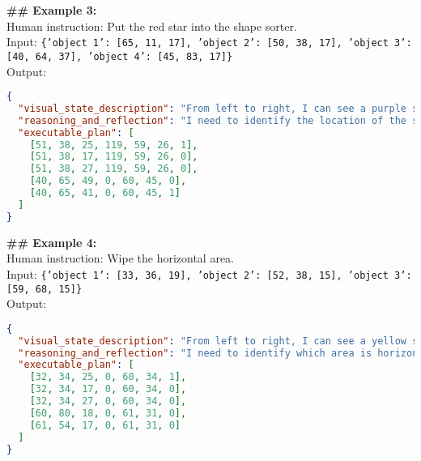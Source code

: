 \begin{tcolorbox}[colback=gray!5!white, colframe=gray!75!black, 
title=In-context examples for EB-Manipulation, boxrule=0.5mm, width=\textwidth, arc=3mm, auto outer arc=true]
\textbf{\#\# Example 3:}\\
Human instruction: Put the red star into the shape sorter.\\
Input: \texttt{\{'object 1': [65, 11, 17], 'object 2': [50, 38, 17], 'object 3': [40, 64, 37], 'object 4': [45, 83, 17]\}}\\
Output:
\begin{lstlisting}[language=json]
{
  "visual_state_description": "From left to right, I can see a purple star at [65, 11, 17], a red star at [50, 38, 17], a shape sorter at [40, 64, 37] and a green star at [45, 83, 17].",
  "reasoning_and_reflection": "I need to identify the location of the star hole on the shape sorter first. I can see that the star hole is at the center of the shape sorter, which is at [40, 64, 37]. Then, the task is to pick up the red star at [50, 38, 17] and put it into the star hole on the shape sorter. The plan involves moving the gripper to the star's position, closing the gripper to pick it up, moving upwards, moving to the top of the star hole, and releasing the star into the hole.",
  "executable_plan": [
    [51, 38, 25, 119, 59, 26, 1], 
    [51, 38, 17, 119, 59, 26, 0], 
    [51, 38, 27, 119, 59, 26, 0], 
    [40, 65, 49, 0, 60, 45, 0], 
    [40, 65, 41, 0, 60, 45, 1]
  ]
}
\end{lstlisting}
\textbf{\#\# Example 4:}\\
Human instruction: Wipe the horizontal area.\\
Input: \texttt{\{'object 1': [33, 36, 19], 'object 2': [52, 38, 15], 'object 3': [59, 68, 15]\}}\\
Output:
\begin{lstlisting}[language=json]
{
  "visual_state_description": "From left to right, I can see a yellow sponge at [33, 36, 19], a green rectangle area at [52, 38, 15] and an orange rectangle area at [59, 68, 15].",
  "reasoning_and_reflection": "I need to identify which area is horizontal first. I can see that the orange rectangle area at [59, 68, 15] is horizontal since it is parallel to the green arrow representing the y-axis of the coordinate system annotated in the image. Then, the task is to pick up the sponge at [33, 36, 19] and use it to wipe the horizontal area at [59, 68, 15]. The plan involves moving the gripper to the sponge's position, closing the gripper to pick it up, moving to the side of the horizontal area, and moving the sponge along the main direction of the horizontal area to wipe it.",
  "executable_plan": [
    [32, 34, 25, 0, 60, 34, 1], 
    [32, 34, 17, 0, 60, 34, 0], 
    [32, 34, 27, 0, 60, 34, 0], 
    [60, 80, 18, 0, 61, 31, 0], 
    [61, 54, 17, 0, 61, 31, 0]
  ]
}
\end{lstlisting}
\end{tcolorbox}
\clearpage
